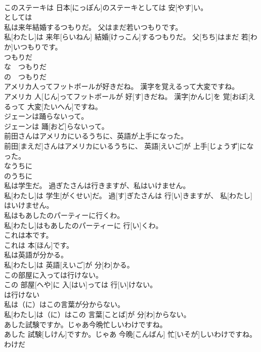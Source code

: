 \documentclass[8pt]{extreport}
\begin{document}
\begin{CJK}{UTF8}{min}
\\	このステーキは 日本[にっぽん]のステーキとしては 安[やす]い。	
\\	としては	
\\	私は来年結婚するつもりだ。 父はまだ若いつもりです。	
\\	私[わたし]は 来年[らいねん] 結婚[けっこん]するつもりだ。 父[ちち]はまだ 若[わか]いつもりです。	
\\	つもりだ 
\\	な　つもりだ 
\\	の　つもりだ	
\\	アメリカ人ってフットボールが好きだね。 漢字を覚えるって大変ですね。	
\\	アメリカ 人[じん]ってフットボールが 好[す]きだね。 漢字[かんじ]を 覚[おぼ]えるって 大変[たいへん]ですね。	
\\	ジェーンは踊らないって。	
\\	ジェーンは 踊[おど]らないって。	
\\	前田さんはアメリカにいるうちに、英語が上手になった。	
\\	前田[まえだ]さんはアメリカにいるうちに、 英語[えいご]が 上手[じょうず]になった。	
\\	なうちに 
\\	のうちに	
\\	私は学生だ。 過ぎたさんは行きますが、私はいけません。	
\\	私[わたし]は 学生[がくせい]だ。 過[す]ぎたさんは 行[い]きますが、 私[わたし]はいけません。	
\\	私はもあしたのパーティーに行くわ。	
\\	私[わたし]はもあしたのパーティーに 行[い]くわ。	
\\	これは本です。	
\\	これは 本[ほん]です。	
\\	私は英語が分かる。	
\\	私[わたし]は 英語[えいご]が 分[わ]かる。	
\\	この部屋に入っては行けない。	
\\	この 部屋[へや]に 入[はい]っては 行[い]けない。	
\\	は行けない	
\\	私は（に）はこの言葉が分からない。	
\\	私[わたし]は（に）はこの 言葉[ことば]が 分[わ]からない。	
\\	あした試験ですか。じゃあ今晩忙しいわけですね。	
\\	あした 試験[しけん]ですか。じゃあ 今晩[こんばん] 忙[いそが]しいわけですね。	
\\	わけだ 

\end{CJK}
\end{document}

